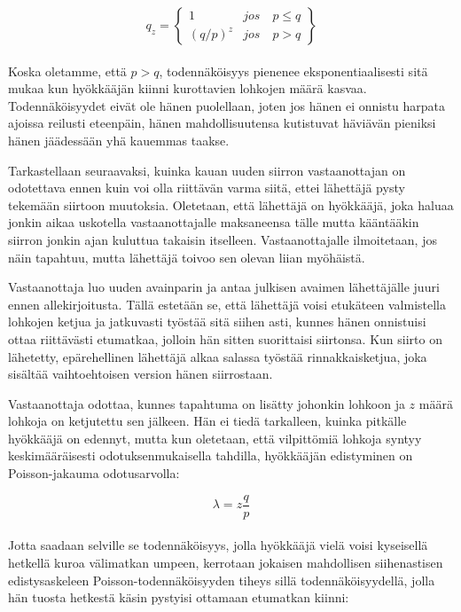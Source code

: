 \documentclass{article}
\begin{document}
\begin{equation*}
   q_{z} = 
   \begin{Bmatrix}
 1 & jos\quad p \leq q \\
  (q/p)^{z} & jos\quad p > q
 \end{Bmatrix}
\end{equation*}
\paragraph{}
Koska oletamme, että $p > q$, todennäköisyys pienenee eksponentiaalisesti sitä mukaa kun hyökkääjän kiinni kurottavien lohkojen määrä kasvaa. Todennäköisyydet eivät ole hänen puolellaan, joten jos hänen ei onnistu harpata ajoissa reilusti eteenpäin, hänen mahdollisuutensa kutistuvat häviävän pieniksi hänen jäädessään yhä kauemmas taakse.

Tarkastellaan seuraavaksi, kuinka kauan uuden siirron vastaanottajan on odotettava ennen kuin voi olla riittävän varma siitä, ettei lähettäjä pysty tekemään siirtoon muutoksia. Oletetaan, että lähettäjä on hyökkääjä, joka haluaa jonkin aikaa uskotella vastaanottajalle maksaneensa tälle mutta kääntääkin siirron jonkin ajan kuluttua takaisin itselleen. Vastaanottajalle ilmoitetaan, jos näin tapahtuu, mutta lähettäjä toivoo sen olevan liian myöhäistä.

Vastaanottaja luo uuden avainparin ja antaa julkisen avaimen lähettäjälle juuri ennen allekirjoitusta. Tällä estetään se, että lähettäjä voisi etukäteen valmistella lohkojen ketjua ja jatkuvasti työstää sitä siihen asti, kunnes hänen onnistuisi ottaa riittävästi etumatkaa, jolloin hän sitten suorittaisi siirtonsa. Kun siirto on lähetetty, epärehellinen lähettäjä alkaa salassa työstää rinnakkaisketjua, joka sisältää vaihtoehtoisen version hänen siirrostaan.

Vastaanottaja odottaa, kunnes tapahtuma on lisätty johonkin lohkoon ja $z$ määrä lohkoja on ketjutettu sen jälkeen. Hän ei tiedä tarkalleen, kuinka pitkälle hyökkääjä on edennyt, mutta kun oletetaan, että vilpittömiä lohkoja syntyy keskimääräisesti odotuksenmukaisella tahdilla, hyökkääjän edistyminen on Poisson-jakauma odotusarvolla:

\begin{equation*}
   \lambda = z \frac{q}{p}
\end{equation*}

\paragraph{} Jotta saadaan selville se todennäköisyys, jolla hyökkääjä vielä voisi kyseisellä hetkellä kuroa välimatkan umpeen, kerrotaan jokaisen mahdollisen siihenastisen edistysaskeleen Poisson-todennäköisyyden tiheys sillä todennäköisyydellä, jolla hän tuosta hetkestä käsin pystyisi ottamaan etumatkan kiinni:
\end{document}

